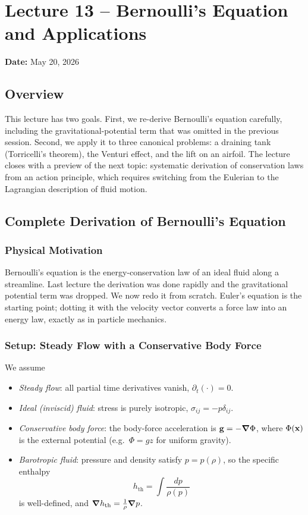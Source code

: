 \documentclass[../main.tex]{subfiles}
\begin{document}
\section{Lecture 13 -- Bernoulli's Equation and Applications}\label{sec:lec13}
\begin{center}
  \textbf{Date:} May 20, 2026
\end{center}

\subsection*{Overview}
This lecture has two goals. First, we re-derive Bernoulli's equation carefully, including the gravitational-potential term that was omitted in the previous session. Second, we apply it to three canonical problems: a draining tank (Torricelli's theorem), the Venturi effect, and the lift on an airfoil. The lecture closes with a preview of the next topic: systematic derivation of conservation laws from an action principle, which requires switching from the Eulerian to the Lagrangian description of fluid motion.

\subsection{Complete Derivation of Bernoulli's Equation}\label{sec:lec13:bernoulli}

\subsubsection*{Physical Motivation}
Bernoulli's equation is the energy-conservation law of an ideal fluid along a streamline. Last lecture the derivation was done rapidly and the gravitational potential term was dropped. We now redo it from scratch. Euler's equation is the starting point; dotting it with the velocity vector converts a force law into an energy law, exactly as in particle mechanics.

\subsubsection{Setup: Steady Flow with a Conservative Body Force}
We assume
\begin{itemize}
  \item \emph{Steady flow}: all partial time derivatives vanish, $\partial_t(\cdot)=0$.
  \item \emph{Ideal (inviscid) fluid}: stress is purely isotropic, $\sigma_{ij}=-p\delta_{ij}$.
  \item \emph{Conservative body force}: the body-force acceleration is $\mathbf{g}=-\grad\Phi$, where $\Phi(\mathbf{x})$ is the external potential (e.g.\ $\Phi=gz$ for uniform gravity).
  \item \emph{Barotropic fluid}: pressure and density satisfy $p=p(\rho)$, so the specific enthalpy
    \[
      h_{\mathrm{th}}=\int\frac{dp}{\rho(p)}
    \]
    is well-defined, and $\grad h_{\mathrm{th}}=\frac{1}{\rho}\grad p$.
\end{itemize}
\end{document}
